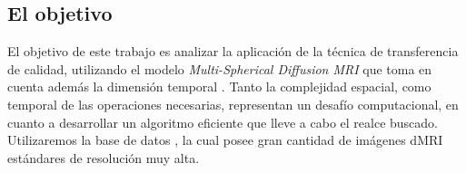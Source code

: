 \documentclass[a4paper,10pt]{article}
\begin{document}
\subsection{El objetivo}
El objetivo de este trabajo es analizar la aplicación de la técnica de 
transferencia de calidad, utilizando el modelo \textit{Multi-Spherical Diffusion MRI} que toma en cuenta además 
la dimensión temporal \citep{Fick}. Tanto la complejidad espacial, como temporal de las 
operaciones necesarias, representan un desafío computacional, en cuanto a 
desarrollar un algoritmo eficiente que lleve a cabo el realce buscado. Utilizaremos la base de datos , la cual posee gran cantidad de imágenes dMRI estándares de resolución muy alta.



\clearpage


\end{document}
